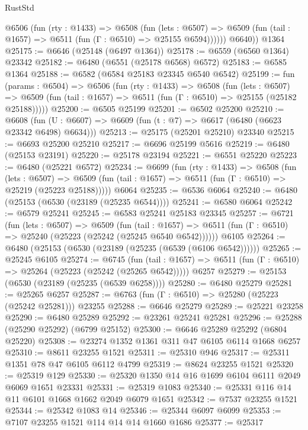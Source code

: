 \begin{lexlean}{RustStd}
\begin{coremodule}
          @6506
            (fun (rty : @1433) =>
            @6508
              (fun (lets : @6507) =>
              @6509 (fun (tail : @1657) => @6511 (fun (Γ : @6510) => @25155 @6594))))))
        @6640))
    @1364
@25175 := @6646 (@25148 (@6497 @1364))
@25178 := @6559 (@6560 @1364) @23342
@25182 := @6480 (@6551 (@25178 @6568) @6572)
@25183 := @6585 @1364
@25188 := @6582 (@6584 @25183 @23345 @6540 @6542)
@25199 := fun (params : @6504) =>
  @6506
    (fun (rty : @1433) =>
    @6508
      (fun (lets : @6507) =>
      @6509 (fun (tail : @1657) => @6511 (fun (Γ : @6510) => @25155 (@25182 @25188)))))
@25200 := @6505 @25199
@25201 := @6502 @25200
@25210 := @6608
    (fun (U : @6607) => @6609 (fun (t : @7) => @6617 (@6480 (@6623 @23342 @6498) @6634)))
@25213 := @25175 (@25201 @25210) @23340
@25215 := @6693 @25200 @25210
@25217 := @6696 @25199 @5616
@25219 := @6480 (@25153 @23191)
@25220 := @25178 @23194
@25221 := @6551 @25220
@25223 := @6480 (@25221 @6572)
@25234 := @6699
    (fun (rty : @1433) =>
    @6508
      (fun (lets : @6507) =>
      @6509 (fun (tail : @1657) => @6511 (fun (Γ : @6510) => @25219 (@25223 @25188)))))
    @6064
@25235 := @6536 @6064
@25240 := @6480 (@25153 (@6530 (@23189 (@25235 @6544))))
@25241 := @6580 @6064
@25242 := @6579 @25241
@25245 := @6583 @25241 @25183 @23345
@25257 := @6721
    (fun (lets : @6507) =>
    @6509
      (fun (tail : @1657) =>
      @6511 (fun (Γ : @6510) => @25240 (@25223 (@25242 (@25245 @6540 @6542))))))
    @6105
@25264 := @6480 (@25153 (@6530 (@23189 (@25235 (@6539 (@6106 @6542))))))
@25265 := @25245 @6105
@25274 := @6745
    (fun (tail : @1657) => @6511 (fun (Γ : @6510) => @25264 (@25223 (@25242 (@25265 @6542)))))
    @6257
@25279 := @25153 (@6530 (@23189 (@25235 (@6539 @6258))))
@25280 := @6480 @25279
@25281 := @25265 @6257
@25287 := @6763 (fun (Γ : @6510) => @25280 (@25223 (@25242 @25281))) @23255
@25288 := @6646 @25279
@25289 := @25221 @23258
@25290 := @6480 @25289
@25292 := @23261 @25241 @25281
@25296 := @25288 (@25290 @25292) (@6799 @25152)
@25300 := @6646 @25289 @25292 (@6804 @25220)
@25308 := @23274 @1352 @1361 @311 @47 @6105 @6114 @1668 @6257
@25310 := @8611 @23255 @1521
@25311 := @25310 @946
@25317 := @25311 @1351 @78 @47 @6105 @6112 @4799
@25319 := @8624 @23255 @1521
@25320 := @25319 @129
@25330 := @25320 @1350 @14 @16 @1699 @6104 @6111 @2049 @6069 @1651 @23331
@25331 := @25319 @1083
@25340 := @25331 @116 @14 @11 @6101 @1668 @1662 @2049 @6079 @1651
@25342 := @7537 @23255 @1521
@25344 := @25342 @1083 @14
@25346 := @25344 @6097 @6099
@25353 := @7107 @23255 @1521 @114 @14 @14 @1660 @1686
@25377 := @25317

\end{coremodule}
\end{lexlean}
